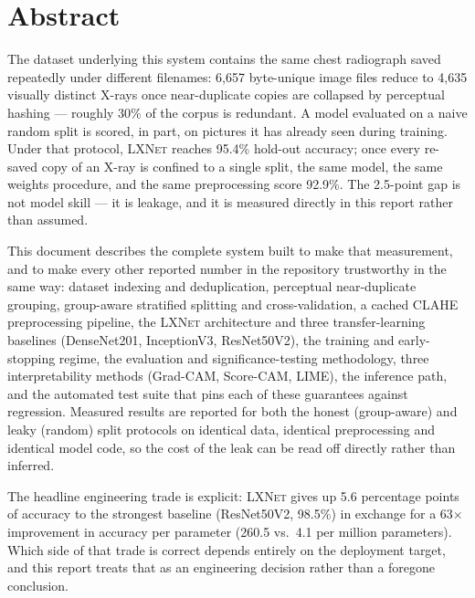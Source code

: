 \documentclass[11pt,a4paper,oneside]{report}
\newcommand{\LXNet}{\textsc{LXNet}}
\begin{document}
\chapter*{Abstract}
The dataset underlying this system contains the same chest radiograph saved
repeatedly under different filenames: 6{,}657 byte-unique image files reduce to
4{,}635 visually distinct X-rays once near-duplicate copies are collapsed by
perceptual hashing --- roughly 30\% of the corpus is redundant. A model
evaluated on a naive random split is scored, in part, on pictures it has
already seen during training. Under that protocol, \LXNet{} reaches 95.4\%
hold-out accuracy; once every re-saved copy of an X-ray is confined to a
single split, the same model, the same weights procedure, and the same
preprocessing score 92.9\%. The 2.5-point gap is not model skill --- it is
leakage, and it is measured directly in this report rather than assumed.

This document describes the complete system built to make that measurement,
and to make every other reported number in the repository trustworthy in the
same way: dataset indexing and deduplication, perceptual near-duplicate
grouping, group-aware stratified splitting and cross-validation, a cached
CLAHE preprocessing pipeline, the \LXNet{} architecture and three
transfer-learning baselines (DenseNet201, InceptionV3, ResNet50V2), the
training and early-stopping regime, the evaluation and significance-testing
methodology, three interpretability methods (Grad-CAM, Score-CAM, LIME), the
inference path, and the automated test suite that pins each of these
guarantees against regression. Measured results are reported for both the
honest (group-aware) and leaky (random) split protocols on identical data,
identical preprocessing and identical model code, so the cost of the leak can
be read off directly rather than inferred.

The headline engineering trade is explicit: \LXNet{} gives up 5.6 percentage
points of accuracy to the strongest baseline (ResNet50V2, 98.5\%) in exchange
for a 63$\times$ improvement in accuracy per parameter (260.5 vs.\ 4.1 per
million parameters). Which side of that trade is correct depends entirely on
the deployment target, and this report treats that as an engineering decision
rather than a foregone conclusion.
\end{document}
